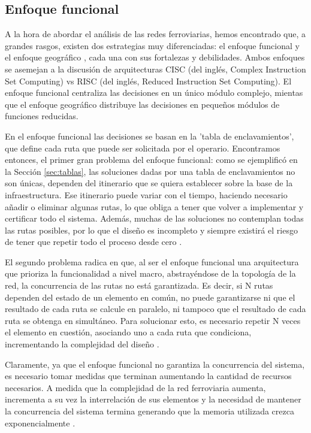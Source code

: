 \subsection{Enfoque funcional}
	\label{sec:funcional}

    A la hora de abordar el análisis de las redes ferroviarias, hemos encontrado que, a grandes rasgos, existen dos estrategias muy diferenciadas: el enfoque funcional y el enfoque geográfico \cite{Paper_9,Paper_204}, cada una con sus fortalezas y debilidades. Ambos enfoques se asemejan a la discusión de arquitecturas CISC (del inglés, Complex Instruction Set Computing) vs RISC (del inglés, Reduced Instruction Set Computing). El enfoque funcional centraliza las decisiones en un único módulo complejo, mientas que el enfoque geográfico distribuye las decisiones en pequeños módulos de funciones reducidas.

    En el enfoque funcional las decisiones se basan en la 'tabla de enclavamientos', que define cada ruta que puede ser solicitada por el operario. Encontramos entonces, el primer gran problema del enfoque funcional: como se ejemplificó en la Sección \ref{sec:tablas}, las soluciones dadas por una tabla de enclavamientos no son únicas, dependen del itinerario que se quiera establecer sobre la base de la infraestructura. Ese itinerario puede variar con el tiempo, haciendo necesario añadir o eliminar algunas rutas, lo que obliga a tener que volver a implementar y certificar todo el sistema. Además, muchas de las soluciones no contemplan todas las rutas posibles, por lo que el diseño es incompleto y siempre existirá el riesgo de tener que repetir todo el proceso desde cero \cite{Paper_204}.

    El segundo problema radica en que, al ser el enfoque funcional una arquitectura que prioriza la funcionalidad a nivel macro, abstrayéndose de la topología de la red, la concurrencia de las rutas no está garantizada. Es decir, si N rutas dependen del estado de un elemento en común, no puede garantizarse ni que el resultado de cada ruta se calcule en paralelo, ni tampoco que el resultado de cada ruta se obtenga en simultáneo. Para solucionar esto, es necesario repetir N veces el elemento en cuestión, asociando uno a cada ruta que condiciona, incrementando la complejidad del diseño \cite{Paper_204}. 
    
    Claramente, ya que el enfoque funcional no garantiza la concurrencia del sistema, es necesario tomar medidas que terminan aumentando la cantidad de recursos necesarios. A medida que la complejidad de la red ferroviaria aumenta, incrementa a su vez la interrelación de sus elementos y la necesidad de mantener la concurrencia del sistema termina generando que la memoria utilizada crezca exponencialmente \cite{Paper_204}.

